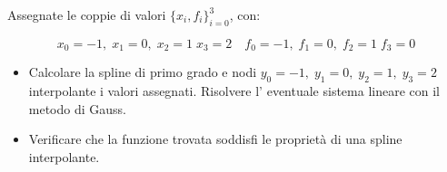 Assegnate le coppie di valori $\{x_i,f_i \}_{i=0}^3$, con:

\[ x_0=-1, \; x_1=0, \; x_2=1  \; x_3=2 \quad f_0=-1, \; f_1=0, \; f_2=1  \; f_3=0 \]

\begin{itemize}
\item Calcolare la spline di primo grado e nodi
$y_0=-1, \; y_1=0, \;y_2=1, \; y_3=2$ interpolante i valori
assegnati. Risolvere l' eventuale sistema lineare con il metodo di
Gauss.
\item Verificare che la funzione trovata soddisfi le propriet\`a
di una spline interpolante.

\end{itemize}
